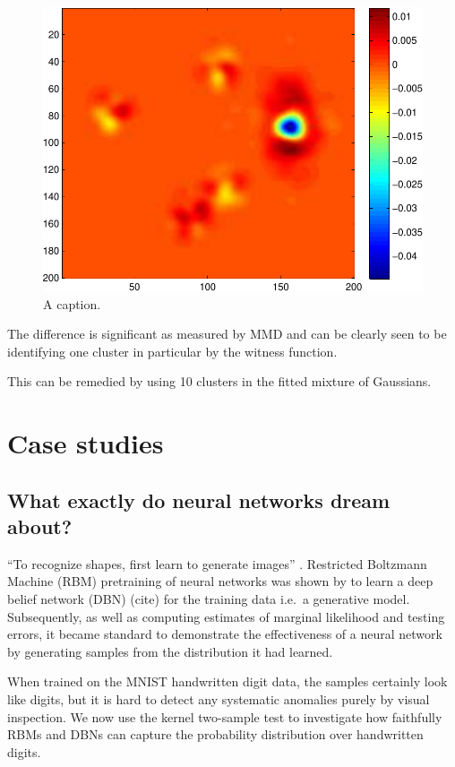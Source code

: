 \documentclass{article}
\def\ie{i.e.\ }
\begin{document}
\begin{figure}[ht]
\centering
\includegraphics[width=0.98\columnwidth]{figures/high_mog_witness}
\caption{
A caption.
}
\label{fig:high_mog_fa}
\end{figure}

The difference is significant as measured by MMD and can be clearly seen to be identifying one cluster in particular by the witness function.

This can be remedied by using 10 clusters in the fitted mixture of Gaussians.

\section{Case studies}

\subsection{What exactly do neural networks dream about?}

``To recognize shapes, first learn to generate images'' \cite{Hinton2007}.
Restricted Boltzmann Machine (RBM) pretraining of neural networks was shown by \cite{Hinton2006} to learn a deep belief network (DBN) (cite) for the training data \ie a generative model.
Subsequently, as well as computing estimates of marginal likelihood and testing errors, it became standard to demonstrate the effectiveness of a neural network by generating samples from the distribution it had learned.

When trained on the MNIST handwritten digit data, the samples certainly look like digits, but it is hard to detect any systematic anomalies purely by visual inspection.
We now use the kernel two-sample test to investigate how faithfully RBMs and DBNs can capture the probability distribution over handwritten digits.
\end{document}
